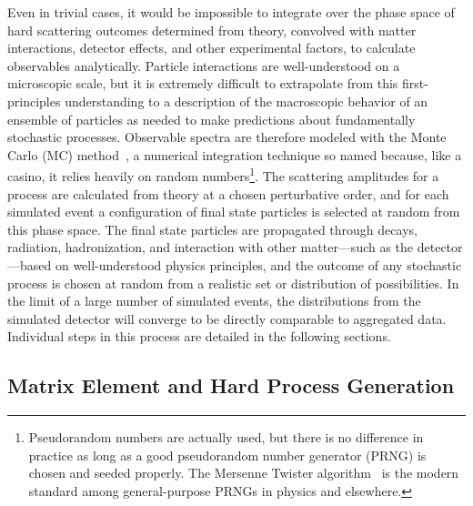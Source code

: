 Even in trivial cases, it would be impossible to integrate over the phase space of hard scattering outcomes determined from theory, convolved with matter interactions, detector effects, and other experimental factors, to calculate observables analytically.
Particle interactions are well-understood on a microscopic scale, but it is extremely difficult to extrapolate from this first-principles understanding to a description of the macroscopic behavior of an ensemble of particles as needed to make predictions about fundamentally stochastic processes.
Observable spectra are therefore modeled with the Monte Carlo (MC) method~\cite{Metropolis:10.2307.2280232,Olive:2016xmw}, a numerical integration technique so named because, like a casino, it relies heavily on random numbers\footnote{Pseudorandom numbers are actually used, but there is no difference in practice as long as a good pseudorandom number generator (PRNG) is chosen and seeded properly. The Mersenne Twister algorithm~\cite{Matsumoto:1998:MTE:272991.272995} is the modern standard among general-purpose PRNGs in physics and elsewhere.}.
The scattering amplitudes for a process are calculated from theory at a chosen perturbative order, and for each simulated event a configuration of final state particles is selected at random from this phase space.
The final state particles are propagated through decays, radiation, hadronization, and interaction with other matter---such as the detector---based on well-understood physics principles, and the outcome of any stochastic process is chosen at random from a realistic set or distribution of possibilities.
In the limit of a large number of simulated events, the distributions from the simulated detector will converge to be directly comparable to aggregated data.
Individual steps in this process are detailed in the following sections.


\subsection{Matrix Element and Hard Process Generation}

